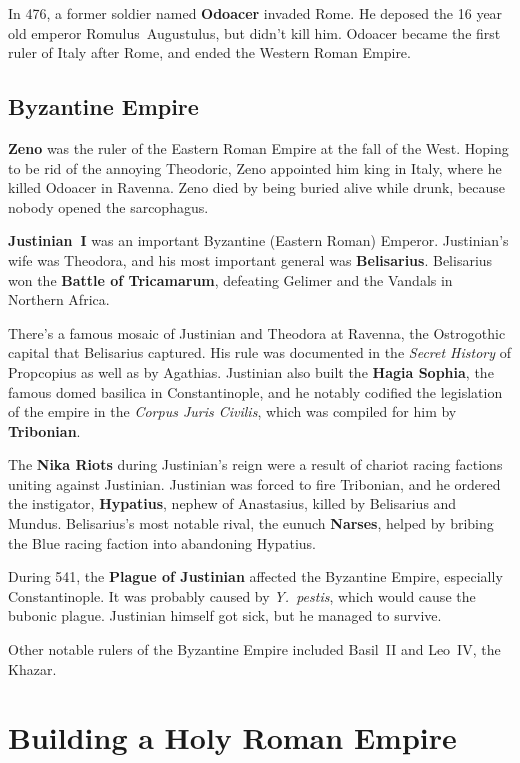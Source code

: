 In 476, a former soldier named \textbf{Odoacer} invaded Rome.
He deposed the 16 year old emperor Romulus~Augustulus, but didn't kill him.
Odoacer became the first ruler of Italy after Rome, and ended the Western Roman Empire.

\subsection*{Byzantine Empire}

\textbf{Zeno} was the ruler of the Eastern Roman Empire at the fall of the West.
Hoping to be rid of the annoying Theodoric, Zeno appointed him king in Italy,
where he killed Odoacer in Ravenna.
Zeno died by being buried alive while drunk, because nobody opened the sarcophagus.

\textbf{Justinian~I} was an important Byzantine (Eastern Roman) Emperor.
Justinian's wife was Theodora, and his most important general was \textbf{Belisarius}.
Belisarius won the \textbf{Battle of Tricamarum},
defeating Gelimer and the Vandals in Northern Africa.

There's a famous mosaic of Justinian and Theodora at Ravenna,
the Ostrogothic capital that Belisarius captured.
His rule was documented in the \textit{Secret History} of Propcopius as well as by Agathias.
Justinian also built the \textbf{Hagia Sophia}, the famous domed basilica in Constantinople,
and he notably codified the legislation of the empire in the \textit{Corpus Juris Civilis},
which was compiled for him by \textbf{Tribonian}.

The \textbf{Nika Riots} during Justinian's reign
were a result of chariot racing factions uniting against Justinian.
Justinian was forced to fire Tribonian,
and he ordered the instigator, \textbf{Hypatius}, nephew of Anastasius,
killed by Belisarius and Mundus.
Belisarius's most notable rival, the eunuch \textbf{Narses},
helped by bribing the Blue racing faction into abandoning Hypatius.

During 541, the \textbf{Plague of Justinian} affected the Byzantine Empire,
especially Constantinople.
It was probably caused by \textit{Y.\ pestis}, which would cause the bubonic plague.
Justinian himself got sick, but he managed to survive.

Other notable rulers of the Byzantine Empire included Basil~II and Leo~IV, the Khazar.

\section{Building a Holy Roman Empire}

